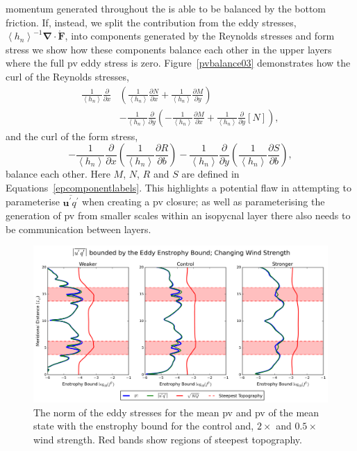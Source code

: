 \documentclass[12pt,a4paper]{report}
\newcommand*\thkmean[1]{\overline{#1}}
\newcommand*\thkres[1]{{#1}^{\prime}}
\newcommand*\nthkmean[1]{\left\langle{#1}\right\rangle}
\newcommand*\spec[1]{\mathring{#1}}
\newcommand*\figref[1]{Figure~\ref{#1}}
\newcommand*{\partialdiff}[2][{}]{\frac{\partial #1}{\partial #2}}
\begin{document}
  momentum generated throughout the is able to be balanced by the bottom friction.
  If, instead, we split the contribution from the eddy stresses, $\nthkmean{h_{n}}^{-1}
  \boldsymbol{\nabla}\cdot\boldsymbol{\spec{F}}$, into components generated by the 
  Reynolds stresses and form stress we show how these components balance each other in
  the upper layers where the full \gls{pv} eddy stress is zero. \figref{pvbalance03}
  demonstrates how the curl of the Reynolds stresses,
  \begin{equation}
  \begin{split}
  \frac{1}{\nthkmean{h_{n}}}\partialdiff{x}&\left(
  \frac{1}{\nthkmean{h_{n}}}\partialdiff[N]{x} +
  \frac{1}{\nthkmean{h_{n}}}\partialdiff[M]{y}\right)\\ &-
  \frac{1}{\nthkmean{h_{n}}}\partialdiff{y}\left(
  -\frac{1}{\nthkmean{h_{n}}}\partialdiff[M]{x} +
  \frac{1}{\nthkmean{h_{n}}}\partialdiff{y}[N]\right),
  \end{split}
  \end{equation}
  and the curl of the form stress,
  \begin{equation}
  -\frac{1}{\nthkmean{h_{n}}}\partialdiff{x}\left(
  \frac{1}{\nthkmean{h_{n}}}\partialdiff[R]{b}\right) -
  \frac{1}{\nthkmean{h_{n}}}\partialdiff{y}\left(
  \frac{1}{\nthkmean{h_{n}}}\partialdiff[S]{b}\right) ,
  \end{equation}
  balance each other. Here $M$, $N$, $R$ and $S$ are defined in
   Equations~\ref{epcomponentlabels}.  This highlights a potential flaw in
   attempting to parameterise $\thkmean{\thkres{\boldsymbol{u}}\thkres{q}}$ when 
   creating a \gls{pv} closure; as well as parameterising the generation 
   of \gls{pv} from smaller scales within an isopycnal layer there also
   needs to be communication between layers. 
   
   \begin{figure}
   	\centering
   	\includegraphics[width=\linewidth]{eqbound_0_1}
   	\caption{ The norm of the eddy stresses for the mean \gls{pv} and
   		\gls{pv} of the mean state with the enstrophy bound for
   		the control and, $2\times$ and  $0.5\times$ wind strength. Red bands show regions of steepest topography. }
   	\label{eqbound01}
   \end{figure}
   
\end{document}
